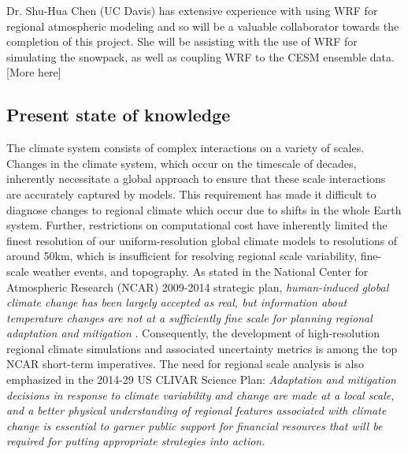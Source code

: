 \documentclass[11pt]{article}
\begin{document}
Dr.  Shu-Hua Chen (UC Davis) has extensive experience with using WRF for regional atmospheric modeling and so will be a valuable collaborator towards the completion of this project. She will be assisting with the use of WRF for simulating the snowpack, as well as coupling WRF to the CESM ensemble data. {\color{red}[More here]}


\subsection{Present state of knowledge}

The climate system consists of complex interactions on a variety of scales. Changes in the climate system, which occur on the timescale of decades, inherently necessitate a global approach to ensure that these scale interactions are accurately captured by models. This requirement has made it difficult to diagnose changes to regional climate which occur due to shifts in the whole Earth system. Further, restrictions on computational cost have inherently limited the finest resolution of our uniform-resolution global climate models to resolutions of around 50km, which is insufficient for resolving regional scale variability, fine-scale weather events, and topography. As stated in the National Center for Atmospheric Research (NCAR) 2009-2014 strategic plan, \textit{human-induced global climate change has been largely accepted as real, but information about temperature changes are not at a sufficiently fine scale for planning regional adaptation and mitigation} \citep{NCAR2009}. Consequently, the development of high-resolution regional climate simulations and associated uncertainty metrics is among the top NCAR short-term imperatives.  The need for regional scale analysis is also emphasized in the 2014-29 US CLIVAR Science Plan: \textit{Adaptation and mitigation decisions in response to climate variability and change are made at a local scale, and a better physical understanding of regional features associated with climate change is essential to garner public support for financial resources that will be required for putting appropriate strategies into action.}
\end{document}
